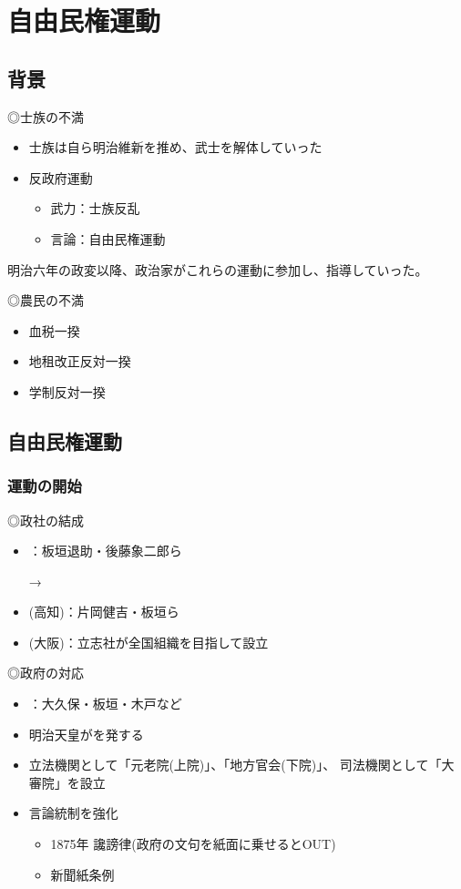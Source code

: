 \documentclass[12pt,fleqn]{ltjsarticle}
\begin{document}
\clearpage
\section{自由民権運動}
\subsection{背景}
◎士族の不満
\begin{itemize}
\item 士族は自ら明治維新を推め、武士を解体していった
\item 反政府運動
\begin{itemize}
\item 武力：士族反乱
\item 言論：自由民権運動
\end{itemize}
\end{itemize}
明治六年の政変以降、政治家がこれらの運動に参加し、指導していった。


◎農民の不満
\begin{itemize}
\item 血税一揆
\item 地租改正反対一揆
\item 学制反対一揆
\end{itemize}

\subsection{自由民権運動}
\subsubsection{運動の開始}
◎政社の結成
\begin{itemize}
\item {}：板垣退助・後藤象二郎ら

→
\item {}(高知)：片岡健吉・板垣ら
\item {}(大阪)：立志社が全国組織を目指して設立
\end{itemize}
◎政府の対応
\begin{itemize}
\item {}：大久保・板垣・木戸など
\item 明治天皇がを発する
\item 立法機関として「元老院(上院)」、「地方官会(下院)」、
司法機関として「大審院」を設立
\item 言論統制を強化
\begin{itemize}
\item 1875年 讒謗律(政府の文句を紙面に乗せるとOUT)
\item 新聞紙条例
\end{itemize}
\end{itemize}
\end{document}
